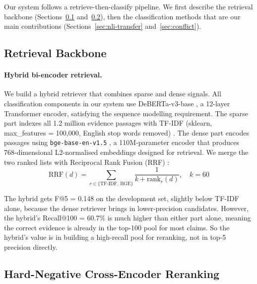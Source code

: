 \documentclass[11pt]{article}
\begin{document}
Our system follows a retrieve-then-classify pipeline.
We first describe the retrieval backbone (Sections~\ref{sec:retrieval-base}
and~\ref{sec:reranker}), then the classification methods that are
our main contributions (Sections~\ref{sec:nli-transfer}
and~\ref{sec:conflict}).

\subsection{Retrieval Backbone}
\label{sec:retrieval-base}

\paragraph{Hybrid bi-encoder retrieval.}
We build a hybrid retriever that combines sparse and dense signals.
All classification components in our system use DeBERTa-v3-base
\citep{he-etal-2021-deberta}, a 12-layer Transformer encoder, satisfying
the sequence modelling requirement.
The sparse part indexes all 1.2 million evidence passages with TF-IDF
(sklearn, max\_features = 100{,}000, English stop words removed)
\citep{manning-etal-2008-ir}.
The dense part encodes passages using \texttt{bge-base-en-v1.5}
\citep{xiao-etal-2023-bge}, a 110M-parameter encoder that produces
768-dimensional L2-normalised embeddings designed for retrieval.
We merge the two ranked lists with Reciprocal Rank Fusion (RRF)
\citep{cormack-etal-2009-reciprocal}:
\begin{equation}
  \text{RRF}(d) = \sum_{r \in \{\text{TF-IDF},\, \text{BGE}\}}
  \frac{1}{k + \text{rank}_r(d)}, \quad k = 60
\end{equation}

The hybrid gets F@5 = 0.148 on the development set, slightly below
TF-IDF alone, because the dense retriever brings in
lower-precision candidates.
However, the hybrid's Recall@100 = 60.7\% is much higher than either
part alone, meaning the correct evidence is already in the top-100
pool for most claims.
So the hybrid's value is in building a high-recall pool for reranking,
not in top-5 precision directly.

\subsection{Hard-Negative Cross-Encoder Reranking}
\label{sec:reranker}
\end{document}
